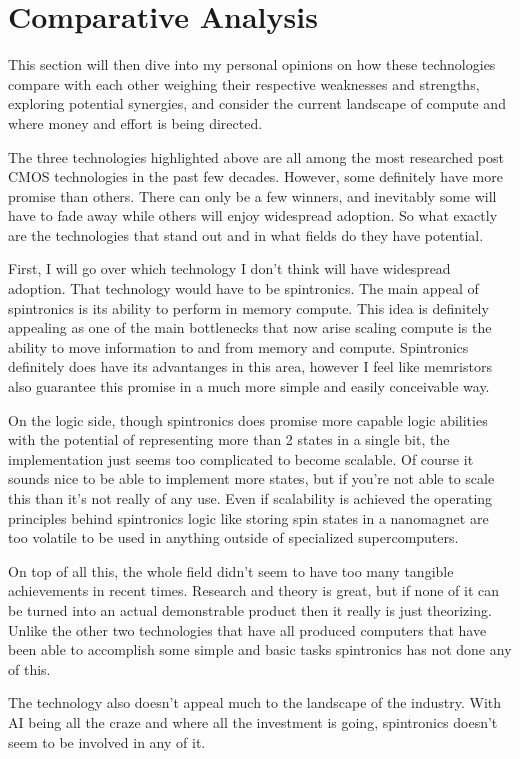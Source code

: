 \documentclass[sigconf]{acmart}
\begin{document}
\section{Comparative Analysis}
This section will then dive into my personal opinions on how these 
technologies compare with each other weighing their respective 
weaknesses and strengths, exploring potential synergies, and consider 
the current landscape of compute and where money and effort is 
being directed. 

The three technologies highlighted above are all among the most 
researched post CMOS technologies in the past few decades. However, 
some definitely have more promise than others. There can 
only be a few winners, and inevitably some will have to fade away 
while others will enjoy widespread adoption. So what exactly are the 
technologies that stand out and in what fields do they have potential. 

First, I will go over which technology I don't think will have 
widespread adoption. That technology would have to be spintronics. 
The main appeal of spintronics is its ability to perform in memory compute. 
This idea is definitely appealing as one of the main bottlenecks that now arise 
scaling compute is the ability to move information to and from memory and compute. 
Spintronics definitely does have its advantanges in this area, however I feel like 
memristors also guarantee this promise in a much more simple and easily conceivable way. 

On the logic side, though spintronics does promise more capable logic abilities with 
the potential of representing more than 2 states in a single bit, the implementation 
just seems too complicated to become scalable. Of course it sounds nice to be able 
to implement more states, but if you're not able to scale this than it's not really 
of any use. Even if scalability is achieved the operating principles behind spintronics 
logic like storing spin states in a nanomagnet are too volatile to be used in anything 
outside of specialized supercomputers. 

On top of all this, the whole field didn't seem to have too many tangible achievements in 
recent times. Research and theory is great, but if none of it can be turned into an actual 
demonstrable product then it really is just theorizing. Unlike the other two technologies 
that have all produced computers that have been able to accomplish some simple and basic tasks
spintronics has not done any of this. 

The technology also doesn't appeal much to the landscape of the industry. With AI being 
all the craze and where all the investment is going, spintronics doesn't seem to 
be involved in any of it. 
\end{document}
